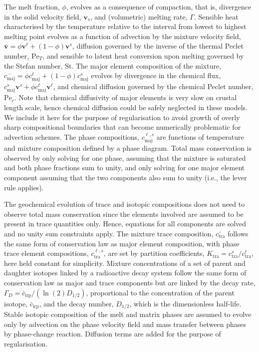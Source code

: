 \documentclass[12pt,a4paper]{article}
\begin{document}
The melt fraction, $\phi$, evolves as a consequence of compaction, that is, divergence in the solid velocity field, $\mathbf{v}_s$, and (volumetric) melting rate, $\Gamma$. Sensible heat characterised by the temperature relative to the interval from lowest to highest melting point evolves as a function of advection by the mixture velocity field, $\bar{\mathbf{v}} = \phi \mathbf{v}^\ell + (1-\phi) \mathbf{v}^s$, diffusion governed by the inverse of the thermal Peclet number, $\mathrm{Pe}_T$, and sensible to latent heat conversion upon melting governed by the Stefan number, $\mathrm{St}$. The major element composition of the mixture, $\bar{c_\mathrm{maj}} = \phi c_\mathrm{maj}^\ell + (1-\phi) c_\mathrm{maj}^s$ evolves by divergence in the chemical flux, $c_\mathrm{maj}^s \mathbf{v}^s  + \phi c_\mathrm{maj}^\ell \mathbf{v}^\ell$, and chemical diffusion governed by the chemical Peclet number, $\mathrm{Pe}_c$. Note that chemical diffusivity of major elements is very slow on crustal length scale, hence chemical diffusion could be safely neglected in these models. We include it here for the purpose of regularisation to avoid growth of overly sharp compositional boundaries that can become numerically problematic for advection schemes. The phase compositions, $c_\mathrm{maj}^{\ell,s}$ are functions of temperature and mixture composition defined by a phase diagram. Total mass conservation is observed by only solving for one phase, assuming that the mixture is saturated and both phase fractions sum to unity, and only solving for one major element component assuming that the two components also sum to unity (i.e., the lever rule applies).

The geochemical evolution of trace and isotopic compositions does not need to observe total mass conservation since the elements involved are assumed to be present in trace quantities only. Hence, equations for all components are solved and no unity sum constraints apply. The mixture trace composition, $\bar{c_\mathrm{tra}}$ follows the same form of conservation law as major element composition, with phase trace element compositions, $c_\mathrm{tra}^{\ell,s}$, are set by partition coefficients, $K_\mathrm{tra} = c_\mathrm{tra}^{s}/c_\mathrm{tra}^{\ell}$, here held constant for simplicity. Mixture concentrations of a set of parent and daughter isotopes linked by a radioactive decay system follow the same form of conservation law as major and trace components but are linked by the decay rate, $\Gamma_D = \bar{c}_\mathrm{irp} / (\ln(2) D_\mathrm{1/2})$, proportional to the concentration of the parent isotope, $\bar{c}_\mathrm{irp}$, and the decay number, $D_\mathrm{1/2}$, which is the dimensionless half-life. Stable isotopic composition of the melt and matrix phases are assumed to evolve only by advection on the phase velocity field and mass transfer between phases by phase-change reaction. Diffusion terms are added for the purpose of regularisation.
\end{document}
